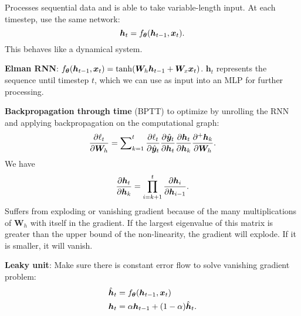 \documentclass{article}
\newcommand{\lft}{\mathopen{}\mathclose\bgroup\left}
\newcommand{\rgt}{\aftergroup\egroup\right}
\renewcommand{\vec}[1]{\bm{#1}}
\newcommand{\mat}[1]{\bm{#1}}
\newenvironment{topic}[1]
{\textbf{\sffamily \colorbox{black}{\rlap{\textbf{\textcolor{white}{#1}}}\hspace{\linewidth}\hspace{-2\fboxsep}}} \\ \vspace{0.2cm}}
{}
\begin{document}
\begin{multicols*}{2}
\begin{topic}{Fully convolutional neural networks}
    \end{topic}

    \begin{topic}{Recurrent neural networks}

        Processes sequential data and is able to take variable-length input. At each timestep, use the same
        network: \[
            \vec{h}_t = f_{\vec{\theta}} \lft( \vec{h}_{t-1}, \vec{x}_t \rgt).
        \]
        This behaves like a dynamical system.

        \textbf{Elman RNN}: $f_{\vec{\theta}}(\vec{h}_{t-1}, \vec{x}_t) = \tanh \lft( \mat{W}_h \vec{h}_{t-1} + \mat{W}_x \vec{x}_t \rgt)$.
        $\vec{h}_t$ represents the sequence until timestep $t$, which we can use as input into an
        MLP for further processing.

        \textbf{Backpropagation through time} (BPTT) to optimize by unrolling the RNN and applying backpropagation
        on the computational graph: \[
            \pdv{\ell_t}{\mat{W}_h} = \sum\nolimits_{k=1}^{t} \pdv{\ell_t}{\hat{\vec{y}}_t} \pdv{\hat{\vec{y}}_t}{\vec{h}_t} \pdv{\vec{h}_t}{\vec{h}_k} \pdv{^+ \vec{h}_k}{\mat{W}_h}.
        \]
        We have \[
            \pdv{\vec{h}_t}{\vec{h}_k} = \prod_{i=k+1}^t \pdv{\vec{h}_i}{\vec{h}_{i-1}}.
        \]
        Suffers from exploding or vanishing gradient because of the many multiplications of $\mat{W}_h$
        with itself in the gradient. If the largest eigenvalue of this matrix is greater than the upper
        bound of the non-linearity, the gradient will explode. If it is smaller, it will vanish.

        \textbf{Leaky unit}: Make sure there is constant error flow to solve vanishing gradient problem:
        \begin{align*}
            \hat{\vec{h}}_t & = f_{\vec{\theta}}\lft( \vec{h}_{t-1}, \vec{x}_t \rgt) \\
            \vec{h}_t       & = \alpha \vec{h}_{t-1} + (1-\alpha) \hat{\vec{h}}_t.
        \end{align*}


\end{topic}
\end{multicols*}
\end{document}
